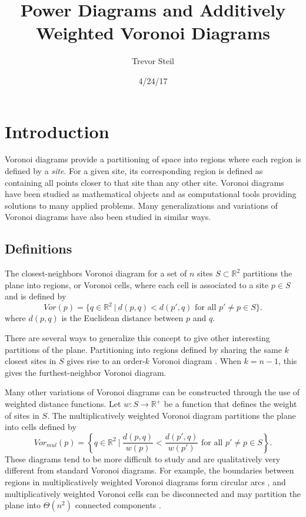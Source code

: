 \documentclass[a4paper, 11pt]{article}
\title{Power Diagrams and Additively Weighted Voronoi Diagrams }
\date{4/24/17}
\author{Trevor Steil}
\newcommand{\R}{\mathbb{R}}
\begin{document}
\maketitle

\section{Introduction}
Voronoi diagrams provide a partitioning of space into regions where each region is defined by a \textit{site}. For a given site, its corresponding
region is defined as containing all points closer to that site than any other site. Voronoi diagrams have been studied as mathematical objects and as
computational tools providing solutions to many applied problems. Many generalizations and variations of Voronoi diagrams have also been studied in
similar ways.

\subsection{Definitions}

The closest-neighbors Voronoi diagram for a set of $n$ sites $S \subset \R^2$ partitions the plane into regions, or Voronoi cells, where each cell is associated to a
site $p \in S$ and is defined by
\begin{equation*}
  Vor(p) = \{ q \in \R^2 \ | \ d(p,q) < d(p',q) \text{ for all } p' \neq p \in S \} .
\end{equation*}
where $d(p,q)$ is the Euclidean distance between $p$ and $q$.

There are several ways to generalize this concept to give other interesting partitions of the plane. Partitioning into regions defined by sharing the
same $k$ closest sites in $S$ gives rise to an order-$k$ Voronoi diagram \cite{aurenhammer_survey}. When $k=n-1$, this gives the furthest-neighbor
Voronoi diagram.

Many other variations of Voronoi diagrams can be constructed through the use of weighted distance functions. Let $w: S \to \R^+$ be a function that defines
the weight of sites in $S$. The multiplicatively weighted Voronoi diagram partitions the plane into cells defined by
\begin{equation*}
  Vor_{mul}(p) = \left\{ q \in \R^2 \ \big| \ \frac{d(p,q)}{w(p)} < \frac{d(p',q)}{w(p')} \text{ for all } p' \neq p \in S \right\}.
\end{equation*}
These diagrams tend to be more difficult to study and are qualitatively very different from standard Voronoi diagrams. For example,
the boundaries between regions in multiplicatively weighted Voronoi diagrams form circular arcs \cite{ash-bolker}, and multiplicatively weighted Voronoi
cells can be disconnected and may partition the plane into $\Theta(n^2)$ connected components \cite{aurenhammer_survey}.
\end{document}
